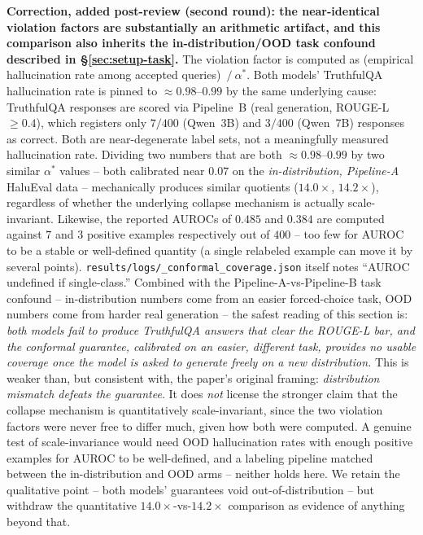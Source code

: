 \documentclass[onecolumn]{jmlr}
\begin{document}
\textbf{Correction, added post-review (second round): the near-identical
violation factors are substantially an arithmetic artifact, and this
comparison also inherits the in-distribution/OOD task confound described
in \S\ref{sec:setup-task}.} The violation factor is computed as
(empirical hallucination rate among accepted queries)~$/~\alpha^*$. Both
models' TruthfulQA hallucination rate is pinned to ${\approx}0.98$--$0.99$
by the same underlying cause: TruthfulQA responses are scored via
Pipeline~B (real generation, ROUGE-L~$\geq 0.4$), which registers only
$7/400$ (Qwen~3B) and $3/400$ (Qwen~7B) responses as correct. Both are
near-degenerate label sets, not a meaningfully measured hallucination
rate. Dividing two numbers that are both ${\approx}0.98$--$0.99$ by two
similar $\alpha^*$ values -- both calibrated near $0.07$ on the
\emph{in-distribution, Pipeline-A} HaluEval data -- mechanically
produces similar quotients ($14.0\times$, $14.2\times$), regardless of
whether the underlying collapse mechanism is actually scale-invariant.
Likewise, the reported AUROCs of $0.485$ and $0.384$ are computed
against $7$ and $3$ positive examples respectively out of $400$ -- too
few for AUROC to be a stable or well-defined quantity (a single
relabeled example can move it by several points).
\texttt{results/\allowbreak logs/\_\allowbreak conformal\_\allowbreak coverage.json} itself notes ``AUROC
undefined if single-class.'' Combined with the Pipeline-A-vs-Pipeline-B
task confound -- in-distribution numbers come from an easier
forced-choice task, OOD numbers come from harder real generation -- the
safest reading of this section is: \emph{both models fail to produce
TruthfulQA answers that clear the ROUGE-L bar, and the conformal
guarantee, calibrated on an easier, different task, provides no usable
coverage once the model is asked to generate freely on a new
distribution.} This is weaker than, but consistent with, the paper's
original framing: \emph{distribution mismatch defeats the guarantee}. It
does \emph{not} license the stronger claim that the collapse mechanism
is quantitatively scale-invariant, since the two violation factors were
never free to differ much, given how both were computed. A genuine test
of scale-invariance would need OOD hallucination rates with enough
positive examples for AUROC to be well-defined, and a labeling pipeline
matched between the in-distribution and OOD arms -- neither holds here.
We retain the qualitative point -- both models' guarantees void
out-of-distribution -- but withdraw the quantitative
$14.0\times$-vs-$14.2\times$ comparison as evidence of anything beyond
that.
\end{document}
